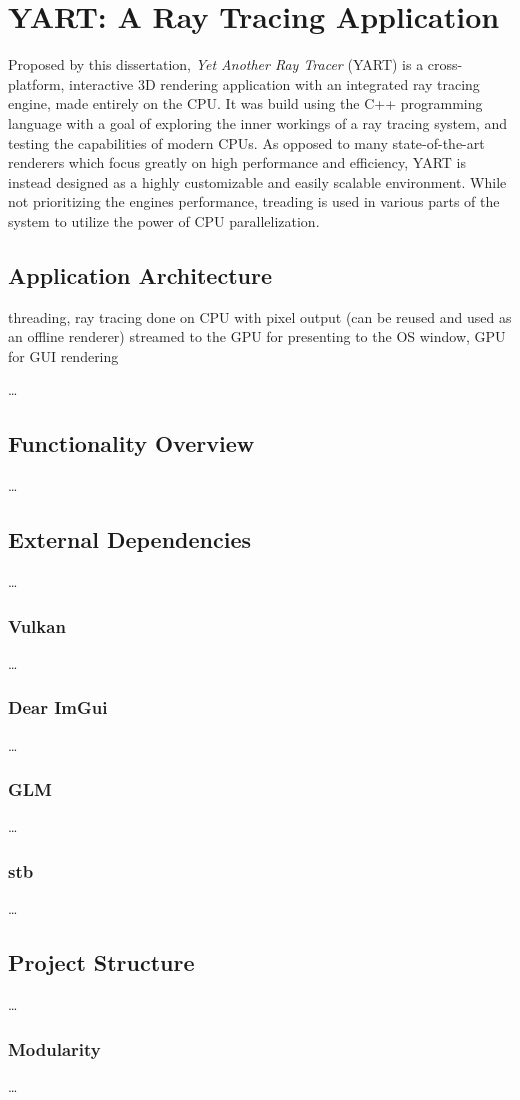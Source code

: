 \chapter{YART: A Ray Tracing Application} \label{ch:Application}

Proposed by this dissertation, \textit{Yet Another Ray Tracer} (YART) is a cross-platform, interactive 3D rendering application with an integrated ray tracing engine, made entirely on the CPU. 
It was build using the C++ programming language with a goal of exploring the inner workings of a ray tracing system, and testing the capabilities of modern CPUs.
As opposed to many state-of-the-art renderers which focus greatly on high performance and efficiency, YART is instead designed as a highly customizable and easily scalable environment. 
While not prioritizing the engines performance, treading is used in various parts of the system to utilize the power of CPU parallelization.

\section{Application Architecture}

threading, ray tracing done on CPU with pixel output (can be reused and used as an offline renderer) streamed to the GPU for presenting to the OS window, GPU for GUI rendering 

\dots

\section{Functionality Overview}

\dots

\section{External Dependencies}

\dots

\subsection{Vulkan}

\dots

\subsection{Dear ImGui}

\dots

\subsection{GLM}

\dots

\subsection{stb}

\dots

\section{Project Structure}

\dots

\subsection{Modularity}

\dots

